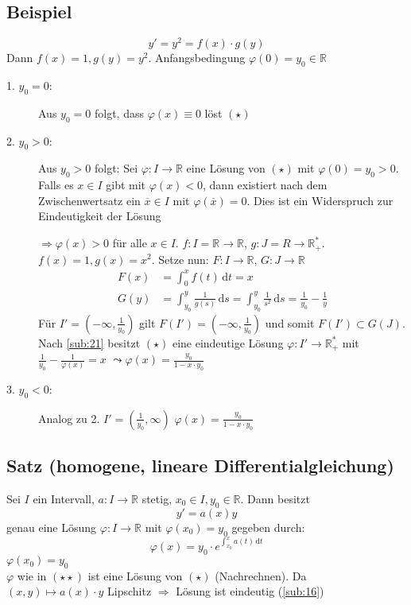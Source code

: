 \subsection[Beispiel: Anwendung von \ref{sub:21} auf $y' =y^2$]{Beispiel} %
\label{sub:22}
\[
	y' = y^2 = f(x) \cdot g(y) \tag{$\star$}
\]
Dann $f(x)= 1, g(y)= y^2$. Anfangsbedingung $\varphi(0)=y_0 \in \mathds{R}$
\begin{description}
	\item[1. $y_0=0$:] Aus $y_0=0$ folgt, dass $\varphi(x) \equiv 0$ löst $(\star)$
	\item[2. $y_0 >0$:] Aus $y_0 >0$ folgt: Sei $\varphi: I \to \mathds{R}$ eine Lösung von $(\star)$ mit $\varphi(0)= y_0 > 0$. Falls es $x \in I$ gibt 
	mit $\varphi(x)<0$, dann
	existiert nach dem Zwischenwertsatz ein $\overline{x} \in I $ mit $\varphi(\overline{x} )=0$. Dies ist ein Widerspruch zur Eindeutigkeit der Lösung \light
	
	$\Rightarrow \varphi(x)>0$ für alle $x \in I$. $f : I=\mathds{R} \to \mathds{R}$, $g : J=R \to \mathds{R}_+^*$. $f(x)=1, g(x)=x^2$. Setze nun:
	$F : I \to \mathds{R}$, $G : J  \to \mathds{R}$
	\begin{align*}
		F(x) &= \int_{0} ^{x} \! f(t)  \, \mathrm{d}t = x \\
		G(y) &= \int_{y_0} ^{y} \! \frac{1}{g(s)}  \, \mathrm{d}s = \int_{y_0} ^{y} \! \frac{1}{s^2}  \, \mathrm{d}s = \frac{1}{y_0} - \frac{1}{y}   
	\end{align*}
	Für $I'=(- \infty, \frac{1}{y_0} )$ gilt $F(I')= (-\infty, \frac{1}{y_0} )$ und somit $F(I') \subset G(J)$. Nach \ref{sub:21} besitzt $(\star)$ eine eindeutige Lösung
	$\varphi : I' \to \mathds{R}_+^*$ mit $\frac{1}{y_0}- \frac{1}{\varphi(x)}= x  $ $\leadsto \varphi(x)= \frac{y_0}{1- x \cdot y_0} $
	\item[3. $y_0<0$:] Analog zu 2. $I'= (\frac{1}{y_0}, \infty )$ $\varphi(x)= \frac{y_0}{1- x \cdot y_0} $ 
\end{description}

\subsection{Satz (homogene, lineare Differentialgleichung)} %
\label{sub:23}
Sei $I$ ein Intervall, $a : I \to \mathds{R}$ stetig, $x_0 \in I, y_0 \in \mathds{R}$. Dann besitzt 
\[
	y' = a(x) y \tag{$\star$}
\]
genau eine Lösung $\varphi : I \to \mathds{R}$ mit $\varphi(x_0)= y_0$ gegeben durch:
\[
	\varphi(x) = y_0 \cdot e^{\int_{x_0} ^{x} \! a(t)  \, \mathrm{d}t} \tag{$\star\star$}
\]
$\varphi(x_0)= y_0$ \checkmark \\
$\varphi$ wie in $(\star \star)$ ist eine Lösung von $(\star)$ (Nachrechnen). Da $(x,y) \mapsto a(x) \cdot y$ Lipschitz $\Rightarrow$ Lösung ist eindeutig (\ref{sub:16}) \bewende

